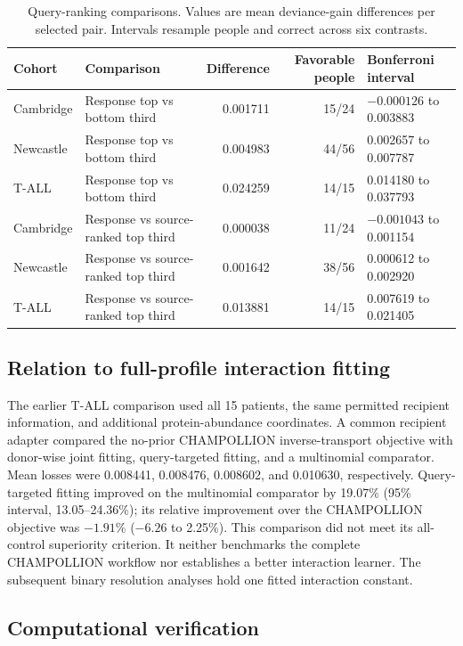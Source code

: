 \begin{table}[htbp]
\caption{Query-ranking comparisons. Values are mean deviance-gain differences
per selected pair. Intervals resample people and correct across six contrasts.}
\centering\small
\begin{tabularx}{\textwidth}{@{}lYrrY@{}}
\toprule
Cohort & Comparison & Difference & Favorable people & Bonferroni interval\\
\midrule
Cambridge & Response top vs bottom third & 0.001711 & 15/24 & $-0.000126$ to 0.003883\\
Newcastle & Response top vs bottom third & 0.004983 & 44/56 & 0.002657 to 0.007787\\
T-ALL & Response top vs bottom third & 0.024259 & 14/15 & 0.014180 to 0.037793\\
Cambridge & Response vs source-ranked top third & 0.000038 & 11/24 & $-0.001043$ to 0.001154\\
Newcastle & Response vs source-ranked top third & 0.001642 & 38/56 & 0.000612 to 0.002920\\
T-ALL & Response vs source-ranked top third & 0.013881 & 14/15 & 0.007619 to 0.021405\\
\bottomrule
\end{tabularx}
\end{table}

\subsection{Relation to full-profile interaction fitting}

The earlier T-ALL comparison used all 15 patients, the same permitted
recipient information, and additional protein-abundance coordinates.
A common recipient adapter compared the no-prior CHAMPOLLION inverse-transport
objective \cite{champollion} with donor-wise joint fitting, query-targeted
fitting, and a multinomial comparator. Mean losses were 0.008441, 0.008476,
0.008602, and 0.010630, respectively. Query-targeted fitting improved on the
multinomial comparator by 19.07\% (95\% interval, 13.05--24.36\%); its relative
improvement over the CHAMPOLLION objective was $-1.91\%$
($-6.26$ to 2.25\%). This comparison did not meet its all-control superiority
criterion. It neither benchmarks the complete CHAMPOLLION workflow nor
establishes a better interaction learner. The subsequent binary resolution
analyses hold one fitted interaction constant.

\subsection{Computational verification}

